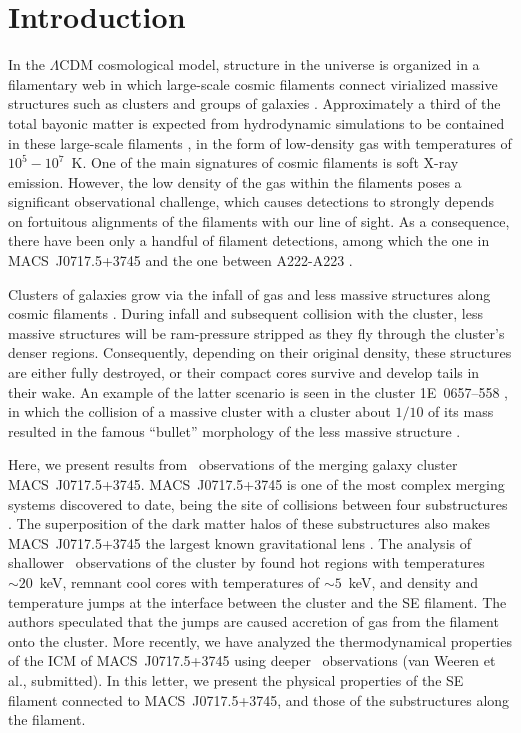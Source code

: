 \section{Introduction}

In the $\Lambda$CDM cosmological model, structure in the universe is organized in a filamentary web in which large-scale cosmic filaments connect virialized massive structures such as clusters and groups of galaxies \citep[e.g., ][]{Einasto1994}. Approximately a third of the total bayonic matter is expected from hydrodynamic simulations to be contained in these large-scale filaments \citep[e.g.][]{Dave2001}, in the form of low-density gas with temperatures of $10^5-10^7$~K. One of the main signatures of cosmic filaments is soft X-ray emission. However, the low density of the gas within the filaments poses a significant observational challenge, which causes detections to strongly depends on fortuitous alignments of the filaments with our line of sight. As a consequence, there have been only a handful of filament detections, among which the one in MACS~J0717.5+3745 \citep{Ebeling2004} and the one between A222-A223 \citep{Dietrich2005, Werner2008}.

Clusters of galaxies grow via the infall of gas and less massive structures along cosmic filaments \citep[e.g.,][]{Springel2006}. During infall and subsequent collision with the cluster, less massive structures will be ram-pressure stripped as they fly through the cluster's denser regions. Consequently, depending on their original density, these structures are either fully destroyed, or their compact cores survive and develop tails in their wake. An example of the latter scenario is seen in the cluster 1E~0657--558 \citep{Elvis1992}, in which the collision of a massive cluster with a cluster about $1/10$ of its mass \citep{Springel2007, Mastropietro2008} resulted in the famous ``bullet'' morphology of the less massive structure \citep{Markevitch2002}.

Here, we present results from \chandra\ observations of the merging galaxy cluster MACS~J0717.5+3745. MACS~J0717.5+3745 \citep[$z=0.546$;][]{Ebeling2001, Ebeling2007} is one of the most complex merging systems discovered to date, being the site of collisions between four substructures \citep{Ma2009, Medezinski2013}. The superposition of the dark matter halos of these substructures also makes MACS~J0717.5+3745 the largest known gravitational lens \citep{Zitrin2009, Medezinski2013}. The analysis of shallower \chandra\ observations of the cluster by \citet{Ma2009} found hot regions with temperatures $\sim 20$~keV, remnant cool cores with temperatures of $\sim 5$~keV, and density and temperature jumps at the interface between the cluster and the SE filament. The authors speculated that the jumps are caused accretion of gas from the filament onto the cluster. More recently, we have analyzed the thermodynamical properties of the ICM of MACS~J0717.5+3745 using deeper \chandra\ observations (van Weeren et al., submitted). In this letter, we present the physical properties of the SE filament connected to MACS~J0717.5+3745, and those of the substructures along the filament.

